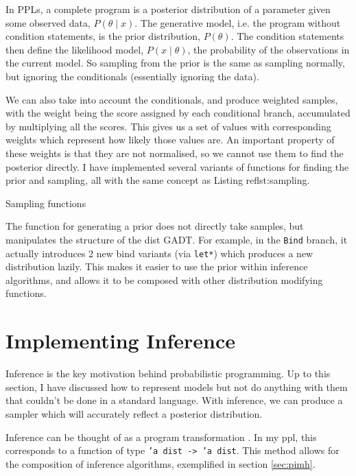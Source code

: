 In PPLs, a complete program is a posterior distribution of a parameter given some observed data, $P(\theta\mid x)$. The generative model, i.e. the program without condition statements, is the prior distribution, $P(\theta)$. The condition statements then define the likelihood model, $P(x\mid \theta)$, the probability of the observations in the current model. So sampling from the prior is the same as sampling normally, but ignoring the conditionals (essentially ignoring the data).
				
We can also take into account the conditionals, and produce weighted samples, with the weight being the score assigned by each conditional branch, accumulated by multiplying all the scores. This gives us a set of values with corresponding weights which represent how likely those values are. An important property of these weights is that they are not normalised, so we cannot use them to find the posterior directly. I have implemented several variants of functions for finding the prior and sampling, all with the same concept as Listing ref{lst:sampling}.
				
\begin{listing}[!htb]
	\centering
	\caption{Sampling functions}
	\label{lst:sampling}
\end{listing}
				
The function for generating a prior does not directly take samples, but manipulates the structure of the dist GADT. For example, in the \texttt{Bind} branch, it actually introduces 2 new bind variants (via \texttt{let*}) which produces a new distribution lazily. This makes it easier to use the prior within inference algorithms, and allows it to be composed with other distribution modifying functions.
				
\section{Implementing Inference} \label{sec:inference}
			
Inference is the key motivation behind probabilistic programming. Up to this section, I have discussed how to represent models but not do anything with them that couldn't be done in a standard language. With inference, we can produce a sampler which will accurately reflect a posterior distribution.
				
Inference can be thought of as a program transformation \cite{scibior2015practical, Zinkov2016ComposingIA}. In my ppl, this corresponds to a function of type \texttt{'a dist -> 'a dist}. This method allows for the composition of inference algorithms, exemplified in section \ref{sec:pimh}.
				
